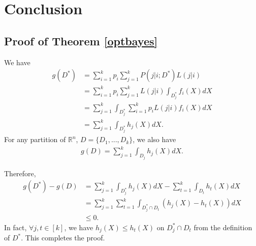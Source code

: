\documentclass[english]{article}
\newenvironment{eqt}{\begin{equation}\begin{aligned}}{\end{aligned}\end{equation}}
\begin{document}
\section{Conclusion}





\newpage
\begin{appendix}
\section{Proof of Theorem \ref{optbayes}}
\par

We have
\begin{eqt}
g(D^*) & = \sum_{i=1}^kp_i\sum_{j=1}^kP(j|i;D^*)L(j|i) \\
& = \sum_{i=1}^kp_i\sum_{j=1}^kL(j|i)\int_{D_j^*}f_i(X)dX \\
& = \sum_{j=1}^k\int_{D_j^*}\sum_{i=1}^kp_iL(j|i)f_i(X)dX \\
& = \sum_{j=1}^k\int_{D_j^*}h_j(X)dX.
\end{eqt}
For any partition of $\mathbb{R}^n$, $D = \{D_1, ..., D_k\}$, we also have
\begin{eqt}
g(D) = \sum_{j=1}^k\int_{D_j}h_j(X)dX.
\end{eqt}

Therefore, 
\begin{eqt}
g(D^*) - g(D) & = \sum_{j=1}^k\int_{D_j^*}h_j(X)dX - \sum_{t=1}^k\int_{D_t}h_t(X)dX \\
& = \sum_{j=1}^k\sum_{t=1}^k\int_{D_j^*\cap D_t}\left(h_j(X)-h_t(X)\right)dX \\
& \leqslant 0.
\end{eqt}
In fact, $\forall j, t\in[k]$, we have $h_j(X)\leqslant h_t(X)$ on $D_j^*\cap D_t$ from the definition of $D^*$. This completes the proof.
\end{appendix}
\end{document}
